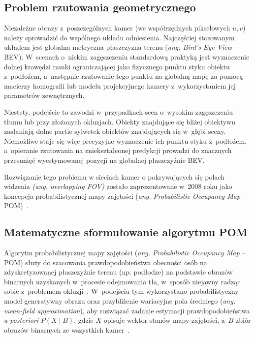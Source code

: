 \subsection{Problem rzutowania geometrycznego}

Niezależne obrazy z~poszczególnych kamer (we współrzędnych pikselowych $u, v$) należy sprowadzić do
wspólnego układu odniesienia. Najczęściej stosowanym układem jest globalna metryczna płaszczyzna
terenu (\textit{ang. Bird's-Eye View} -- BEV). W~scenach o~niskim zagęszczeniu standardową praktyką
jest wyznaczenie dolnej krawędzi ramki ograniczającej jako fizycznego punktu styku obiektu
z~podłożem, a~następnie rzutowanie tego punktu na globalną mapę za pomocą macierzy homografii lub
modelu projekcyjnego kamery z~wykorzystaniem jej parametrów zewnętrznych.

Niestety, podejście to zawodzi w~przypadkach scen o~wysokim zagęszczeniu tłumu lub przy złożonych
okluzjach. Obiekty znajdujące się bliżej obiektywu zasłaniają dolne partie sylwetek obiektów
znajdujących się w~głębi sceny. Niemożliwe staje się więc precyzyjne wyznaczenie ich punktu styku
z~podłożem, a~opieranie rzutowania na zniekształconej predykcji prowadzi do znacznych przesunięć
wyestymowanej pozycji na globalnej płaszczyźnie BEV.

Rozwiązanie tego problemu w sieciach kamer o pokrywających się polach widzenia \textit{(ang.
  overlapping FOV)} zostało zaprezentowane w~2008 roku jako koncepcja probabilistycznej mapy
zajętości (\textit{ang. Probabilistic Occupancy Map} -- POM)~\cite{fleuret2008}.

\subsection{Matematyczne sformułowanie algorytmu POM}

Algorytm probabilistycznej mapy zajętości (\textit{ang. Probabilistic Occupancy Map} -- POM) służy
do szacowania prawdopodobieństwa obecności osób na zdyskretyzowanej płaszczyźnie terenu (np.
podłodze) na podstawie obrazów binarnych uzyskanych w~procesie odejmowania tła, w~sposób niejawny
radząc sobie z~problemem okluzji~\cite{fleuret2008, mandeljc2013tracking}. W~podejściu tym
wykorzystano probabilistyczny model generatywny obrazu oraz przybliżenie wariacyjne pola średniego
(\textit{ang. mean-field approximation}), aby rozwiązać zadanie estymacji prawdopodobieństwa
\textit{a posteriori} $P(X \mid B)$, gdzie $X$ opisuje wektor stanów mapy zajętości, a~$B$ zbiór
obrazów binarnych ze wszystkich kamer~\cite{fleuret2008}.

